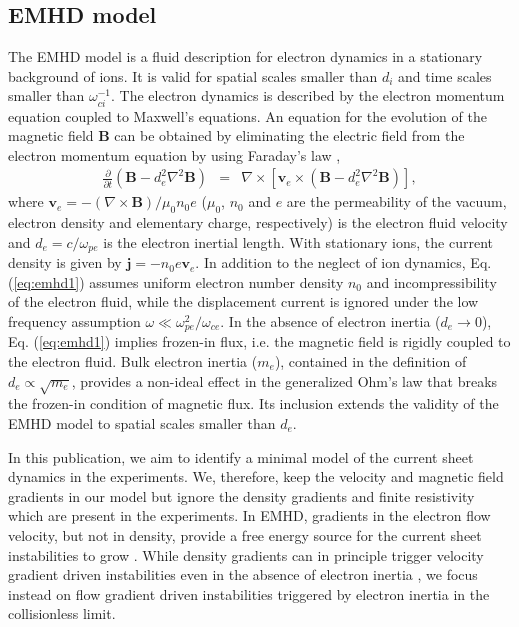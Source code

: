 \documentclass[aip,preprint]{revtex4-1}
\begin{document}
\subsection{EMHD model}
The EMHD model is a fluid description for electron dynamics in a stationary background of ions. It is valid for spatial scales smaller than $d_i$ and time scales smaller than $\omega_{ci}^{-1}$. The electron dynamics is described by the electron momentum equation coupled to Maxwell's equations. An equation for the evolution of the magnetic field $\mathbf{B}$ can be obtained by eliminating the electric field from the electron momentum equation by using Faraday's law \citep{kingsep90},
\begin{eqnarray}
\frac{\partial}{\partial t}(\mathbf{B}-d_e^2\nabla^2\mathbf{B})&=&\nabla \times
[\mathbf{v}_e\times (\mathbf{B}-d_e^2\nabla^2\mathbf{B})]
\label{eq:emhd1},
\end{eqnarray}
where $\mathbf{v}_e=-(\nabla\times\mathbf{B})/\mu_0n_0e$ ($\mu_0$, $n_0$ and $e$ are the permeability of the vacuum, electron density and elementary charge, respectively) is the electron fluid velocity and $d_e=c/\omega_{pe}$ is the electron inertial length. 
With stationary ions, the current density is given by $\mathbf{j}=-n_0e\mathbf{v}_{e}$. In addition to the neglect of  ion dynamics, Eq. (\ref{eq:emhd1}) assumes uniform electron number density $n_0$ and incompressibility of the electron fluid, while the displacement current is ignored under the low frequency assumption $\omega \ll \omega_{pe}^2/\omega_{ce}$. In the absence of electron inertia ($d_e\rightarrow 0$), Eq. (\ref{eq:emhd1}) implies frozen-in flux, i.e. the magnetic field is rigidly coupled to the electron fluid. Bulk electron inertia ($m_e$), contained in the definition of $d_e \propto \sqrt{m_e}$, provides a non-ideal effect in the generalized Ohm's law that breaks the frozen-in condition of magnetic flux. Its inclusion extends the validity of the EMHD model to spatial scales smaller than $d_e$. 

In this publication, we aim to identify a minimal model of the current sheet dynamics in the experiments. 
We, therefore, keep the velocity and magnetic field gradients in our model but ignore the density gradients  and finite resistivity which are present in the experiments. In EMHD, gradients in the electron flow velocity, but not in density, provide a free energy source for the current sheet instabilities to grow \cite{sundar2010}. While density gradients can in principle trigger velocity gradient driven instabilities even in the absence of electron inertia \cite{wood2014}, we  focus instead on flow gradient driven instabilities triggered by electron inertia in the collisionless limit.
\end{document}
